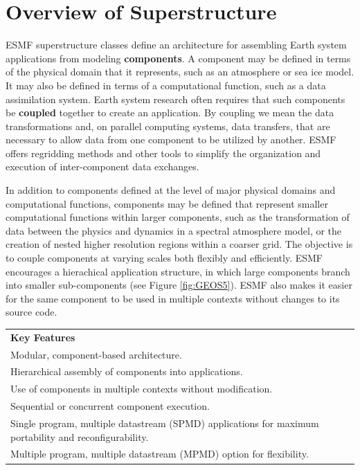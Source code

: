 %

\section{Overview of Superstructure}

ESMF superstructure classes define an architecture for assembling
Earth system applications from modeling {\bf components}.  A component
may be defined in terms of the physical domain that it represents,
such as an atmosphere or sea ice model.  It may also be defined in terms
of a computational function, such as a data assimilation system.
Earth system research often requires that such components be {\bf coupled} 
together to create an application.  By coupling we mean the data 
transformations and, on parallel computing systems, data transfers, 
that are necessary to allow data from one component to be utilized by 
another.  ESMF offers regridding methods and other tools to simplify 
the organization and execution of inter-component data exchanges.  

In addition to components defined at the level of major physical 
domains and computational functions, components may be defined that 
represent smaller computational functions within larger components, 
such as the transformation of data between the physics and dynamics 
in a spectral atmosphere model, 
or the creation of nested higher resolution regions 
within a coarser grid.  The objective is to couple components at varying 
scales both flexibly and efficiently.  ESMF encourages a hierachical
application structure, in which large components branch into 
smaller sub-components (see Figure \ref{fig:GEOS5}).  ESMF also makes 
it easier for the same component to be used in multiple contexts 
without changes to its source code.

\begin{center}  
\begin{tabular}{|p{6in}|}
\hline
\vspace{.01in}
{\bf Key Features} \\[.01in]
Modular, component-based architecture. \\
Hierarchical assembly of components into applications.\\
Use of components in multiple contexts without modification.\\
Sequential or concurrent component execution.\\
Single program, multiple datastream (SPMD) applications for 
maximum portability and reconfigurability.\\
Multiple program, multiple datastream (MPMD) option for 
flexibility.\\ [.03in] \hline
\end{tabular}
\end{center}

